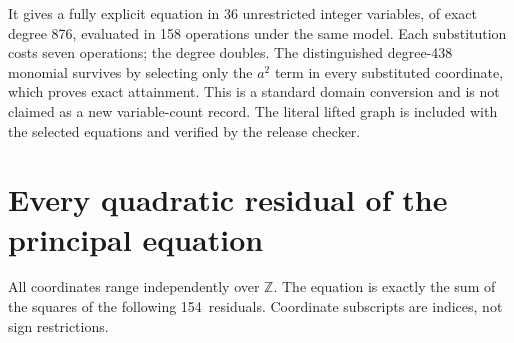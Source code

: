 \documentclass[11pt]{article}
\theoremstyle{remark}\newtheorem{remark}[theorem]{Remark}
\newcommand{\Z}{\mathbb Z}\newcommand{\N}{\mathbb N}
\newcommand{\DirectRows}{154}
\begin{document}
It gives a fully explicit equation in 36 unrestricted integer variables,
of exact degree 876, evaluated in 158 operations under the same model.
Each substitution costs seven operations; the degree doubles. The
distinguished degree-438 monomial survives by selecting only the $a^2$
term in every substituted coordinate, which proves exact attainment.
This is a standard domain conversion and is not claimed as a new
variable-count record. The literal lifted graph is included with the
selected equations and verified by the release checker.



\section{Every quadratic residual of the principal equation}\label{app:rows}

All coordinates range independently over $\Z$. The equation is exactly
the sum of the squares of the following \DirectRows\ residuals.
Coordinate subscripts are indices, not sign restrictions.
\end{document}
